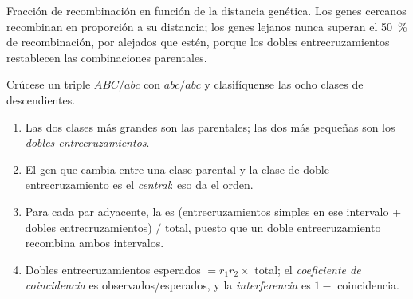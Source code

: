 \begin{omfigure}

{\small Fracción de recombinación en función de la distancia genética.
Los genes cercanos recombinan en proporción a su distancia; los genes
lejanos nunca superan el \qty{50}{\%} de recombinación, por alejados que
estén, porque los dobles entrecruzamientos restablecen las combinaciones
parentales.}
\end{omfigure}

\begin{method}\label{met:b2:meiosis-heredity:threepoint}
Crúcese un triple  $ABC/abc$ con $abc/abc$ y clasifíquense
las ocho clases de descendientes.
\begin{enumerate}
  \item Las dos clases más grandes son las parentales; las dos más
        pequeñas son los \emph{dobles entrecruzamientos}.
  \item El gen que cambia entre una clase parental y la clase de doble
        entrecruzamiento es el \emph{central}: eso da el orden.
  \item Para cada par adyacente, la  es
        (entrecruzamientos simples en ese intervalo + dobles
        entrecruzamientos) $/$ total, puesto que un doble
        entrecruzamiento recombina ambos intervalos.
  \item Dobles entrecruzamientos esperados $= r_1 r_2 \times$ total; el
        \emph{coeficiente de coincidencia} es observados/esperados, y la
        \emph{interferencia} es $1 -$ coincidencia.
\end{enumerate}
\end{method}

